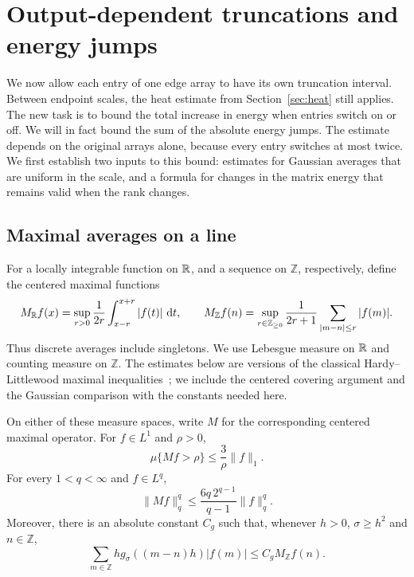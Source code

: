 \section{Output-dependent truncations and energy jumps}\label{sec:jumps}

We now allow each entry of one edge array to have its own truncation
interval.  Between endpoint scales, the heat estimate from
Section~\ref{sec:heat} still applies.  The new task is to bound the total
increase in energy when entries switch on or off.  We will in fact bound
the sum of the absolute energy jumps.  The estimate depends on the
original arrays alone, because every entry switches at most twice.
We first establish two inputs to this bound: estimates for Gaussian
averages that are uniform in the scale, and a formula for changes in
the matrix energy that remains valid when the rank changes.

\subsection{Maximal averages on a line}

For a locally integrable function on $\mathbb R$, and a sequence on $\mathbb Z$,
respectively, define the centered maximal functions
\[
 M_{\mathbb R}f(x)=\sup_{r>0}\frac1{2r}\int_{x-r}^{x+r}|f(t)|\,\mathop{}\!\mathrm d t,
 \qquad
 M_{\mathbb Z}f(n)=\sup_{r\in\mathbb Z_{\ge0}}
       \frac1{2r+1}\sum_{|m-n|\le r}|f(m)|.
\]
Thus discrete averages include singletons.  We use Lebesgue measure on
$\mathbb R$ and counting measure on $\mathbb Z$.
The estimates below are versions of the classical Hardy--Littlewood
maximal inequalities~\cite[Section~IV]{HardyLittlewood1930}; we include
the centered covering argument and the Gaussian comparison with the
constants needed here.

\begin{lemma}\label{lem:line-maximal}
On either of these measure spaces, write $M$ for the corresponding
centered maximal operator.  For $f\in L^1$ and $\rho>0$,
\[
 \mu\{Mf>\rho\}\le\frac3\rho\|f\|_1.
\]
For every $1<q<\infty$ and $f\in L^q$,
\begin{equation}\label{eq:line-maximal-strong}
 \|Mf\|_q^q\le
 \frac{6q\,2^{q-1}}{q-1}\|f\|_q^q.
\end{equation}
Moreover, there is an absolute constant $C_g$ such that, whenever
$h>0$, $\sigma\ge h^2$ and $n\in\mathbb Z$,
\begin{equation}\label{eq:discrete-gaussian-maximal}
 \sum_{m\in\mathbb Z}h g_\sigma((m-n)h)|f(m)|
 \le C_g M_{\mathbb Z}f(n).
\end{equation}
\end{lemma}

